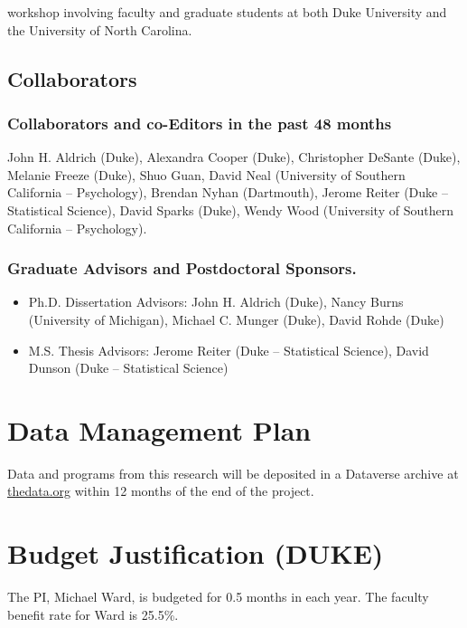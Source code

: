 \documentclass[pdftex,12pt,fullpage,oneside]{amsart}
\begin{document}
workshop involving faculty and graduate students at both Duke
University and the University of North Carolina.  

\subsection*{Collaborators}

\subsubsection*{Collaborators and co-Editors in the past 48 months}
John H. Aldrich (Duke), Alexandra Cooper (Duke), Christopher DeSante
(Duke), Melanie Freeze (Duke), Shuo Guan, David Neal (University of Southern
California -- Psychology), Brendan Nyhan (Dartmouth), Jerome Reiter
(Duke -- Statistical Science), David Sparks (Duke), Wendy Wood
(University of Southern California -- Psychology).

\subsubsection*{Graduate Advisors and Postdoctoral Sponsors.}
\begin{itemize}
\item[] Ph.D. Dissertation Advisors: John H. Aldrich (Duke), Nancy Burns
  (University of Michigan), Michael C. Munger (Duke), David Rohde (Duke)
\item[] M.S. Thesis Advisors: Jerome Reiter (Duke -- Statistical Science), David Dunson
  (Duke -- Statistical Science)
\end{itemize}

\newpage
\setcounter{page}{1}
\thispagestyle{empty}

\section*{Data Management Plan}

\noindent Data and programs from this research will be deposited in a Dataverse archive at \url{thedata.org} within 12 months of the end of the project.

\newpage
\setcounter{page}{1}
\thispagestyle{empty}


\section*{Budget Justification (DUKE)}

The PI, Michael Ward, is budgeted for 0.5 months in each year.  The
faculty benefit rate for Ward is 25.5\%.
\end{document}
